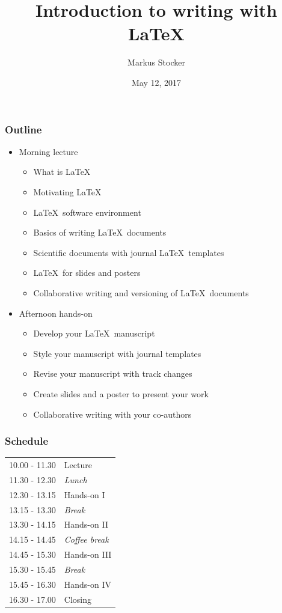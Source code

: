 \documentclass{beamer}
\title{Introduction to writing with LaTeX}
\author{Markus Stocker}
\date{May 12, 2017}
\begin{document}
\maketitle

\begin{frame}
  \frametitle{Outline}
  
  \begin{itemize}
  \item Morning lecture
  \begin{itemize}
  \item What is \LaTeX
  \item Motivating \LaTeX 
  \item \LaTeX~software environment
  \item Basics of writing \LaTeX~documents
  \item Scientific documents with journal \LaTeX~templates
  \item \LaTeX~for slides and posters
  \item Collaborative writing and versioning of \LaTeX~documents
  \end{itemize}
  \item Afternoon hands-on
  \begin{itemize}
  \item Develop your \LaTeX~manuscript
  \item Style your manuscript with journal templates
  \item Revise your manuscript with track changes
  \item Create slides and a poster to present your work
  \item Collaborative writing with your co-authors
  \end{itemize}
  \end{itemize}
\end{frame}

\begin{frame}
  \frametitle{Schedule}
  
  \begin{center}
  \begin{tabular}{ll}
  10.00 - 11.30 & Lecture \\
  11.30 - 12.30 & \emph{Lunch} \\
  12.30 - 13.15 & Hands-on I \\
  13.15 - 13.30 & \emph{Break} \\
  13.30 - 14.15 & Hands-on II \\
  14.15 - 14.45 & \emph{Coffee break} \\
  14.45 - 15.30 & Hands-on III \\
  15.30 - 15.45 & \emph{Break} \\
  15.45 - 16.30 & Hands-on IV \\
  16.30 - 17.00 & Closing
  \end{tabular}
  \end{center}
\end{frame}
\end{document}
